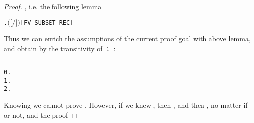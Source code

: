 \begin{proof}
, i.e. the following lemma:
\begin{alltt}
\HOLTokenTurnstile{} \HOLSymConst{\HOLTokenForall{}} .  \ensuremath{(}\ensuremath{[}  \ensuremath{/}\ensuremath{]} \ensuremath{)} \HOLSymConst{\HOLTokenSubset{}}  \hfill{[FV_SUBSET_REC]}
\end{alltt}
Thus we can enrich the assumptions of the current proof goal with above
lemma, and obtain  by the transitivity of $\subseteq$:
\begin{alltt}
   ------------------------------------
    0.  
    1.  
    2.  
\end{alltt}
Knowing  we cannot prove . However, if we knew , then , and then
, no matter if  or not, and the proof

\end{proof}
